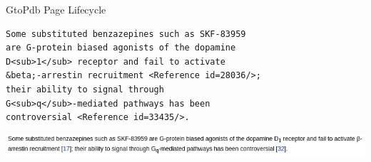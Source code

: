 \documentclass[11.5pt, aspectratio=169]{beamer}
\begin{document}

\begin{frame}[fragile]{GtoPdb Page Lifecycle}

  \begin{minipage}{0.3\textwidth}
  \end{minipage}
  \hfill
  \begin{minipage}{0.575\textwidth}
    {\small
      \begin{verbatim}
Some substituted benzazepines such as SKF-83959
are G-protein biased agonists of the dopamine
D<sub>1</sub> receptor and fail to activate
&beta;-arrestin recruitment <Reference id=28036/>;
their ability to signal through
G<sub>q</sub>-mediated pathways has been
controversial <Reference id=33435/>.
\end{verbatim}
  }

  \begin{center}
    \includegraphics[width=1.075\textwidth]{images/rendered.png}
  \end{center}
  \end{minipage}


\end{frame}
\end{document}
